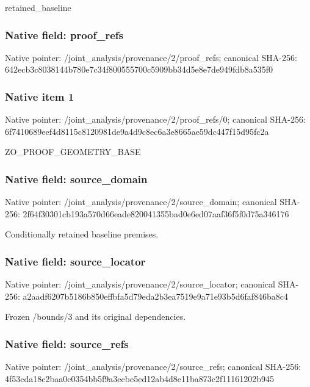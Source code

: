\documentclass[10pt,a4paper]{article}
\begin{document}
retained\_baseline


\subsubsection{Native field: proof\_refs}


Native pointer: /joint\_analysis/provenance/2/proof\_refs; canonical SHA-256: 642ecb3c8038144b780e7c34\allowbreak{}f800555700c5909bb34d5e8e\allowbreak{}7de949fdb8a535f0



\subsubsection{Native item 1}


Native pointer: /joint\_analysis/provenan\allowbreak{}ce/2/proof\_refs/0; canonical SHA-256: 6f7410689eef4d8115c81209\allowbreak{}81de9a4d9c8ec6a3e8665ae5\allowbreak{}9dc447f15d95fc2a


ZO\_PROOF\_GEOMETRY\_BASE


\subsubsection{Native field: source\_domain}


Native pointer: /joint\_analysis/provenan\allowbreak{}ce/2/source\_domain; canonical SHA-256: 2f64f30301cb193a570d66ea\allowbreak{}de820041355bad0e6ed07aaf\allowbreak{}36f5f0d75a346176


Conditionally retained baseline premises.


\subsubsection{Native field: source\_locator}


Native pointer: /joint\_analysis/provenan\allowbreak{}ce/2/source\_locator; canonical SHA-256: a2aadf6207b5186b850effbf\allowbreak{}a5d79eda2b3ea7519e9a71e9\allowbreak{}3b5d6faf846ba8c4


Frozen /bounds/3 and its original dependencies.


\subsubsection{Native field: source\_refs}


Native pointer: /joint\_analysis/provenan\allowbreak{}ce/2/source\_refs; canonical SHA-256: 4f53cda18c2baa0c0354bb5f\allowbreak{}9a3ecbe5ed12ab4d8e11ba87\allowbreak{}3c2f11161202b945
\end{document}
